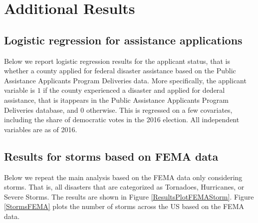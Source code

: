 
\section{Additional Results} \label{AppendixA}

\subsection{Logistic regression for assistance applications}

Below we report logistic regression results for the applicant status, that is whether a county applied for federal disaster assistance based on the Public Assistance Applicants Program Deliveries data. More specifically, the applicant variable is $1$ if the county experienced a disaster and applied for dederal assistance, that is itappears in the Public Assistance Applicants Program Deliveries database, and $0$ otherwise. This is regressed on a few covariates, including the share of democratic votes in the 2016 election. All independent variables are as of 2016.




\subsection{Results for storms based on FEMA data}

Below we repeat the main analysis based on the FEMA data only considering storms. That is, all disasters that are categorized as Tornadoes, Hurricanes, or Severe Storms. The results are shown in Figure \ref{ResultsPlotFEMAStorm}. Figure \ref{StormsFEMA} plots the number of storms across the US based on the FEMA data.

